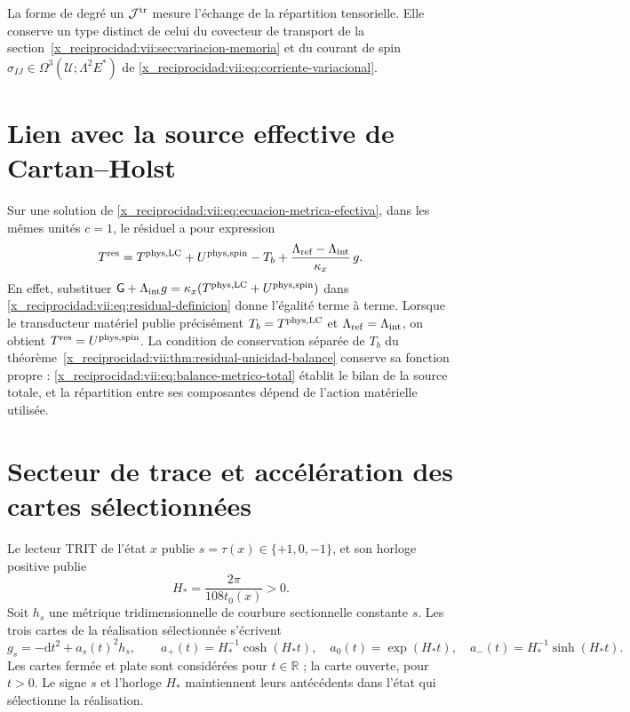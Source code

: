 La forme de degré un \(\mathcal J^{\rm tr}\) mesure l'échange de la répartition tensorielle. Elle conserve un type distinct de celui du covecteur de transport de la section~\ref{x_reciprocidad:vii:sec:variacion-memoria} et du courant de spin \(\sigma_{IJ}\in\Omega^3(\mathcal U;\Lambda^2E^*)\) de \eqref{x_reciprocidad:vii:eq:corriente-variacional}.

\section{Lien avec la source effective de Cartan--Holst}
\label{x_reciprocidad:vii:subsec:residual-fuente-cartan}

Sur une solution de \eqref{x_reciprocidad:vii:eq:ecuacion-metrica-efectiva}, dans les
mêmes unités \(c=1\), le résiduel a pour expression
\begin{equation}
 T^{\rm res}
 =T^{\rm phys,LC}+U^{\rm phys,spin}-T_b
   +\frac{\Lambda_{\rm ref}-\Lambda_{\rm int}}{\kappa_x}\,g.
 \label{x_reciprocidad:vii:eq:residual-composicion-cartan}
\end{equation}
En effet, substituer
\(\mathsf G+\Lambda_{\rm int}g
  =\kappa_x(T^{\rm phys,LC}+U^{\rm phys,spin})\)
dans \eqref{x_reciprocidad:vii:eq:residual-definicion} donne l'égalité terme à terme.
Lorsque le transducteur matériel publie précisément
\(T_b=T^{\rm phys,LC}\) et \(\Lambda_{\rm ref}=\Lambda_{\rm int}\),
on obtient \(T^{\rm res}=U^{\rm phys,spin}\).
La condition de conservation séparée de \(T_b\) du
théorème~\ref{x_reciprocidad:vii:thm:residual-unicidad-balance} conserve sa fonction
propre : \eqref{x_reciprocidad:vii:eq:balance-metrico-total} établit le bilan de la
source totale, et la répartition entre ses composantes dépend de l'action
matérielle utilisée.

\section{Secteur de trace et accélération des cartes sélectionnées}
\label{x_reciprocidad:vii:subsec:residual-aceleracion-ds}

Le lecteur TRIT de l'état \(x\) publie \(s=\tau(x)\in\{+1,0,-1\}\), et son horloge positive publie
\begin{equation}
 H_*=\frac{2\pi}{108t_0(x)}>0.
 \label{x_reciprocidad:vii:eq:reloj-carta-ds}
\end{equation}
Soit \(h_s\) une métrique tridimensionnelle de courbure sectionnelle constante
\(s\). Les trois cartes de la réalisation sélectionnée s'écrivent
\begin{equation}
 g_s=-\mathrm dt^2+a_s(t)^2h_s,\qquad
 a_+(t)=H_*^{-1}\cosh(H_*t),\quad
 a_0(t)=\exp(H_*t),\quad
 a_-(t)=H_*^{-1}\sinh(H_*t).
 \label{x_reciprocidad:vii:eq:cartas-ds-residual}
\end{equation}
Les cartes fermée et plate sont considérées pour \(t\in\mathbb R\) ; la carte ouverte, pour \(t>0\). Le signe \(s\) et l'horloge \(H_*\) maintiennent leurs antécédents dans l'état qui sélectionne la réalisation.

